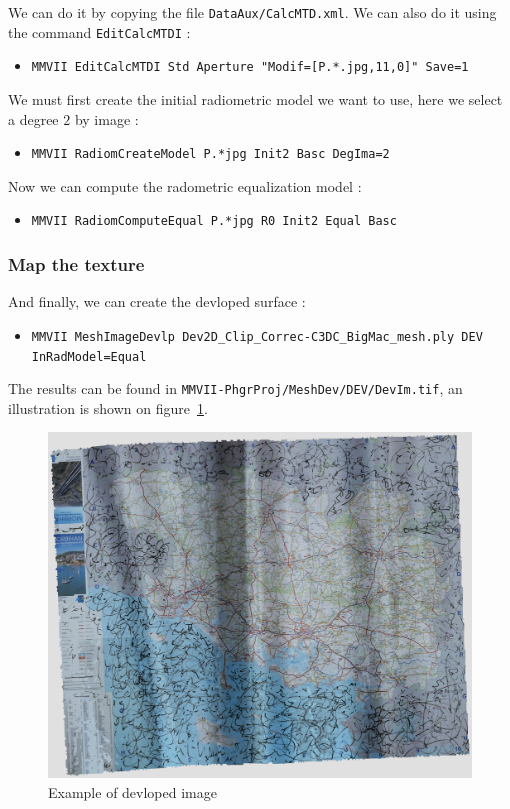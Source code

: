 We can do it by copying the file {\tt DataAux/CalcMTD.xml}. We can also
do it using the command {\tt EditCalcMTDI} :

\begin{itemize}
      \item {\tt MMVII  EditCalcMTDI Std Aperture "Modif=[P.*.jpg,11,0]"  Save=1}
\end{itemize}

We must first create the initial radiometric model  we want to use, here we select
a degree $2$ by image :

\begin{itemize}
	\item {\tt MMVII RadiomCreateModel P.*jpg Init2 Basc DegIma=2}
\end{itemize}

Now we can compute the radometric equalization model :

\begin{itemize}
	\item {\tt MMVII RadiomComputeEqual P.*jpg R0 Init2 Equal Basc}
\end{itemize}



\subsubsection{Map the texture}

And finally, we can create the devloped surface :


\begin{itemize}
	\item {\tt MMVII MeshImageDevlp Dev2D\_Clip\_Correc-C3DC\_BigMac\_mesh.ply  DEV InRadModel=Equal}
\end{itemize}

The results can be found in {\tt MMVII-PhgrProj/MeshDev/DEV/DevIm.tif}, an illustration is shown on figure~\ref{fig:TutDI:DevIm}.


\begin{figure}
\centering
	\includegraphics[width=12 cm]{Tutorial/Images/DevIm.jpg}
	\caption{Example of devloped image}
\label{fig:TutDI:DevIm}
\end{figure}



